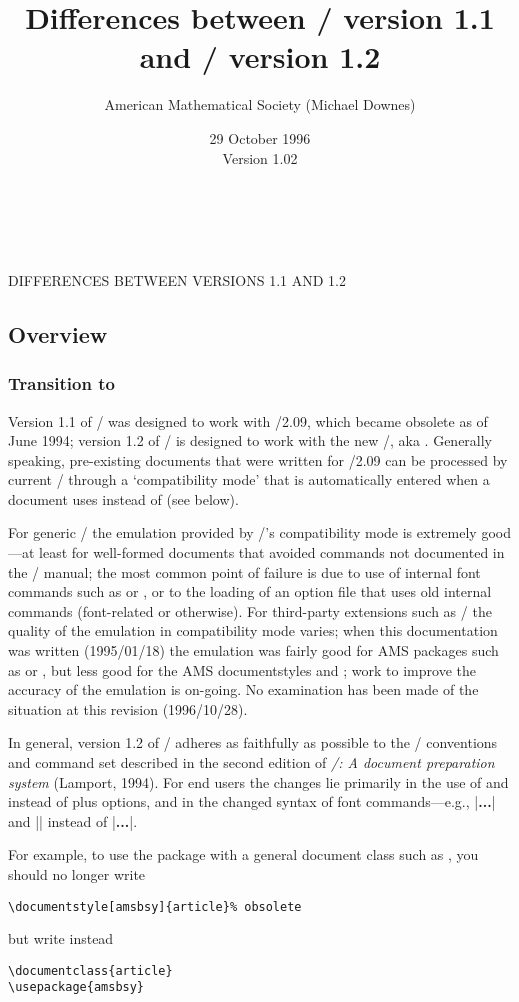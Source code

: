 \documentclass{amsdtx}
\title{Differences between \amslatex/ version 1.1 and \amslatex/
version 1.2}
\author{American Mathematical Society (Michael Downes)}
\date{29 October 1996 \\
Version 1.02}
\makeatletter
\def\maketitle{\chapter*{\large\@title}%
  \section*{\large\normalfont\@author\\\@date}%
  \markboth{DIFFERENCES BETWEEN VERSIONS 1.1 AND 1.2}%
    {DIFFERENCES BETWEEN VERSIONS 1.1 AND 1.2}%
  \mbox{}%
  \thispagestyle{plain}}
\makeatother
\begin{document}
\maketitle

\section{Overview}
\subsection{Transition to \LaTeXe{}}

Version 1.1 of \amslatex/ was designed to work with \latex/2.09, which
became obsolete as of June 1994; version 1.2 of \amslatex/ is designed
to work with the new \latex/, aka \LaTeXe{}. Generally speaking,
pre-existing documents that were written for \latex/2.09 can be
processed by current \latex/ through a `compatibility mode' that is
automatically entered when a document uses  instead of
 (see below).

For generic \latex/ the emulation provided by \latex/'s compatibility
mode is extremely good---at least for well-formed documents that avoided
commands not documented in the \latex/ manual; the most common point of
failure is due to use of internal font commands such as  or
, or to the loading of an option file that uses old internal
commands (font-related or otherwise). For third-party extensions such as
\amslatex/ the quality of the emulation in compatibility mode varies; when
this documentation was written (1995/01/18) the emulation was fairly good
for AMS packages such as  or , but less good for
the AMS documentstyles  and ; work to improve the
accuracy of the emulation is on-going.  No examination has been made of
the situation at this revision (1996/10/28).

In general, version 1.2 of \amslatex/ adheres as faithfully as possible
to the \latex/ conventions and command set described in the second
edition of \emph{\latex/: A document preparation system} (Lamport,
1994). For end users the changes lie primarily in the use of
 and  instead of 
plus options, and in the changed syntax of font commands---e.g.,
|\textbf{...}| and || instead of |{\bf...}|.

For example, to use the  package with a general document
class such as , you should no longer write
\begin{verbatim}
\documentstyle[amsbsy]{article}% obsolete
\end{verbatim}
but write instead
\begin{verbatim}
\documentclass{article}
\usepackage{amsbsy}
\end{verbatim}
\end{document}
